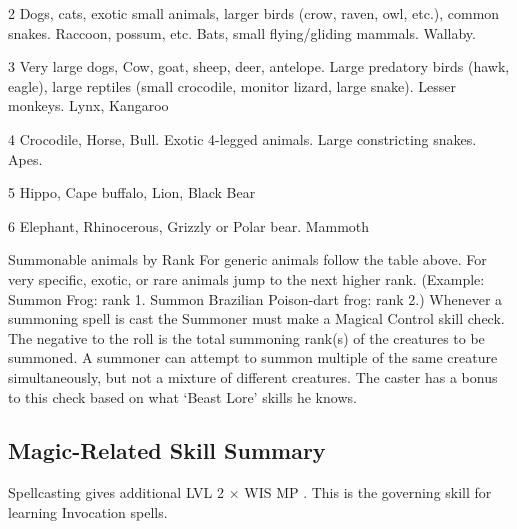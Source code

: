 \documentclass[twoside]{book}
\begin{document}
                  
                   2   
                     Dogs, cats, exotic small animals, larger birds
                     (crow, raven, owl, etc.), common snakes. Raccoon,
                     possum, etc. Bats, small flying/gliding mammals.
                     Wallaby. 
                  
                  
                   3   
                     Very large dogs, Cow, goat, sheep, deer,
                     antelope. Large predatory birds (hawk, eagle), large
                     reptiles (small crocodile, monitor lizard, large
                     snake). Lesser monkeys. Lynx, Kangaroo 
                  
                  
                   4   
                     Crocodile, Horse, Bull. Exotic 4-legged
                     animals. Large constricting snakes. Apes. 
                  
                  
                   5   
                   Hippo, Cape buffalo, Lion, Black Bear   
                  
                  
                   6   
                     Elephant, Rhinocerous, Grizzly or Polar bear.
                     Mammoth 
                  
                
              Summonable animals by Rank  
              For generic animals follow the table above. For
               very specific, exotic, or rare animals jump to the next
               higher rank. (Example: Summon Frog: rank 1. Summon
               Brazilian Poison-dart frog: rank 2.)   Whenever a summoning spell is cast the Summoner
               must make a Magical Control skill check. The negative to
               the roll is the total summoning rank(s) of the creatures
               to be summoned. A summoner can attempt to summon multiple
               of the same creature simultaneously, but not a mixture of
               different creatures. The caster has a bonus to this check
               based on what `Beast Lore' skills he knows.
               
\subsection{Magic-Related Skill Summary}
      
                Spellcasting gives additional     
                       LVL  2   
                        \ensuremath{\times}  WIS  MP
                           . This is the governing skill
                      for learning Invocation spells.
                
\end{document}
